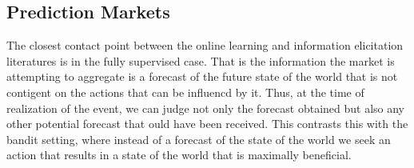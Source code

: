 






\subsection{Prediction Markets} 

The closest contact point between the online learning and information elicitation literatures is in the fully supervised case.
That is the information the market is attempting to aggregate is a forecast of the future state of the world that is not contigent on the actions that can be influencd by it. Thus, at the time of realization of the event, we can judge not only the forecast obtained but also any other potential forecast that ould have been received. 
This contrasts this with the bandit setting, where instead of a forecast of the state of the world we seek an action that results in a state of the world that is maximally beneficial.  


